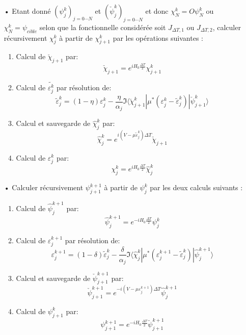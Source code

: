 \begin{itemize}
	
	\item[•] Etant donné $ (\psi^k_j)_{j=0\cdots N}$ et $ (\check{\psi}^k_j)_{j=0\cdots N}$ et donc $\chi^k_N = O\psi^k_N$ ou $ \chi_N^k = \psi_{cible} $ selon que la
	fonctionnelle considérée soit $J_{\Delta T,1}$ ou $J_{\Delta T,2}$, calculer récursivement $\chi_j^k$ à partir de $ \chi^k_{j+1} $ par les opérations suivantes :
	
	\begin{enumerate}
		\item Calcul de $\check{\chi}_{j+1}$ par:
		$$ \check{\chi}_{j+1} = e^{iH_0\frac{\Delta T}{2}} \chi^k_{j+1} $$
		\item Calcul de $\tilde{\varepsilon_j^k}$ par résolution de:
		\begin{equation}
		\tilde{\varepsilon}_j^k = (1-\eta)\varepsilon^k_j - \frac{\eta}{\alpha_j}\Im \langle  \check{\chi}^k_{j+1}|\mu^*(\varepsilon^k_j-\tilde{\varepsilon}^k_j)|\check{\psi}^k_{j+1} \rangle
		\end{equation}
		\item Calcul et sauvegarde de $\hat{\chi}^k_j$ par:
		$$ \hat{\chi}^k_j = e^{i(V-\mu \tilde{\varepsilon}^k_j)\Delta T} \check{\chi}_{j+1} $$
		\item Calcul de $\varepsilon^k_j$ par:
		$$ \chi^k_j = e^{iH_0\frac{\Delta T}{2}} \hat{\chi}_j^k  $$
	\end{enumerate}
	
	\item[•] Calculer récursivement $ \psi^{k+1}_{j+1}$ à partir de $\psi_j^k$ par les deux calculs suivants :
	
	\begin{enumerate}
		\item Calcul de $\hat{\psi}_j^{k+1}$ par:
		$$ \hat{\psi}_j^{k+1} = e^{-iH_0\frac{\Delta T}{2}} \psi^k_j $$
		\item Calcul de $\varepsilon_j^{k+1}$ par résolution de:
		$$ \varepsilon_j^{k+1} = (1-\delta)\tilde{\varepsilon}^k_j - \frac{\delta}{\alpha_j}\Im \langle  \hat{\chi}^k_{j}|\mu^*(\varepsilon^{k+1}_j-\tilde{\varepsilon}^k_j)|\hat{\psi}^{k+1}_{j} \rangle $$
		\item Calcul et sauvegarde de $\check{\psi}^{k+1}_{j+1}$ par:
		$$ \check{\psi}^{k+1}_{j+1} = e^{-i(V-\mu \varepsilon_j^{k+1})\Delta T} \hat{\psi}_j^{k+1}  $$
		\item Calcul de $\psi^k_{j+1}$ par:
		$$ \psi^{k+1}_{j+1} = e^{-iH_0\frac{\Delta T}{2}} \check{\psi}^{k+1}_{j+1} $$
		
	\end{enumerate}
	
\end{itemize}

